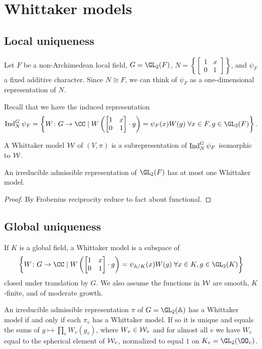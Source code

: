 \chapter{Whittaker models}
\section{Local uniqueness}
Let $F$ be a non-Archimedean local field,
$G = \GL_2(F)$,
$N = \left\{ \begin{bmatrix}
  1 & x \\ 0 & 1
\end{bmatrix} \right\}$,
and $\psi_F$ a fixed additive character.
Since $N \cong F$, we can think of $\psi_F$ as a one-dimensional representation of $N$.

Recall that we have the \alert{induced representation}
\[
  \Ind^G_N \psi_F
  =
  \left\{ W \colon G \to \CC \mid
    W\left( \begin{bmatrix} 1 & x \\ 0 & 1 \end{bmatrix} \cdot g\right)
  = \psi_F(x) W(g) \; \forall x \in F, g \in \GL_2(F)
  \right\}.
\]
\begin{definition}
  A \alert{Whittaker model} $\mathcal W$ of $(V, \pi)$
  is a subrepresentation of $\operatorname{Ind}^G_N \psi_F$ isomorphic to $\mathcal W$.
\end{definition}

\begin{theorem}
  An irreducible admissible representation of $\GL_2(F)$
  has at most one Whittaker model.
\end{theorem}
\begin{proof}
  By Frobenius reciprocity reduce to fact about functional.
\end{proof}

\section{Global uniqueness}
If $K$ is a global field,
a \alert{Whittaker model} is a subspace of
\[
  \left\{ W \colon G \to \CC \mid
    W\left( \begin{bmatrix} 1 & x \\ 0 & 1 \end{bmatrix} \cdot g\right)
    = \psi_{\AA/K}(x) W(g) \; \forall x \in K, g \in \GL_2(K)
  \right\}
\]
closed under translation by $G$.
We also assume the functions in $\mathcal W$ are smooth, $K$-finite,
and of moderate growth.

\begin{theorem}
  An irreducible admissible representation $\pi$ of $G = \GL_2(\AA)$
  has a Whittaker model if and only if each $\pi_v$ has a Whittaker model.
  If so it is unique and equals the sums of
  $g \mapsto \prod_v W_v(g_v)$,
  where $W_v \in \mathcal W_v$ and for almost all $v$ we have $W_v$ equal
  to the spherical element of $\mathcal W_v$, normalized to equal $1$ on $K_v = \GL_2(\OO_v)$.
\end{theorem}

